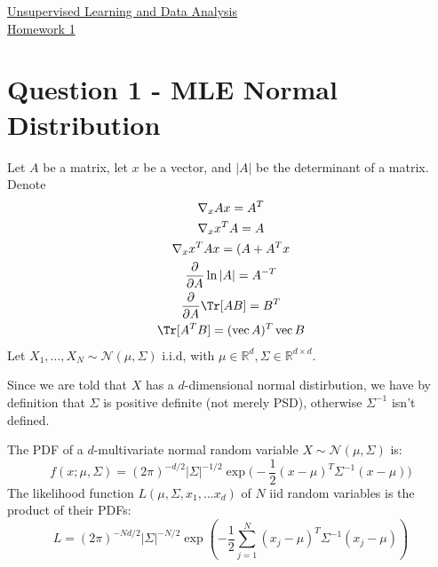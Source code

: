 \documentclass{article}
\begin{document}
\begin{center}
  {\huge \underline{Unsupervised Learning and Data Analysis} \\[5pt] \ul{Homework 1}}
\end{center}
\section*{Question 1 - MLE Normal Distribution}
Let $A$ be a matrix, let $x$ be a vector, and $|A|$ be the determinant of a matrix.
Denote
\begin{gather}
  \nabla_{x} Ax = A^{T} \label{eq:gradX} \\
  \nabla_{x} x^{T}A = A \label{eq:gradXT} \\
  \nabla_{x} x^{T}Ax = (A+A^{T} x \label{eq:gradxtAx} \\
  \frac{\partial }{\partial A} \ln |A| = A^{-T} \label{eq:gradLnDet} \\
  \frac{\partial }{\partial A} \Tr [AB] = B^{T} \label{eq:gradTrProd} \\
  \Tr [A^{T} B] = (\operatorname{vec}A)^{T} \operatorname{vec}B
\end{gather}
Let $X_1, \ldots, X_{N} \sim \mathcal{N}(\mu, \Sigma)$ i.i.d, with $\mu \in \mathbb{R}^{d}, \Sigma \in \mathbb{R}^{d \times d}$.  

Since we are told that $X$ has a $d$-dimensional normal distirbution, we have by definition that  $\Sigma$ is positive definite (not merely PSD), otherwise $\Sigma ^{-1}$ isn't defined. 

The PDF of a $d$-multivariate normal random variable $X \sim \mathcal{N}(\mu, \Sigma)$ is:
\[
  f(x ; \mu, \Sigma) = (2 \pi)^{-d/2} | \Sigma |^{-1/2} \exp \big( -\frac{1}{2} (x-\mu)^{T} \Sigma ^{-1}  (x-\mu) \big)
\]
The likelihood function $L(\mu, \Sigma, x_1, \ldots  x_d)$ of $N$ iid random variables is the product of their PDFs:
\[
  L = (2 \pi )^{-Nd/2} | \Sigma|^{-N/2} \exp \left( -\frac{1}{2} \sum_{j=1}^{N} (x_j-\mu)^{T} \Sigma ^{-1}  (x_j-\mu) \right) 
\]
\end{document}

